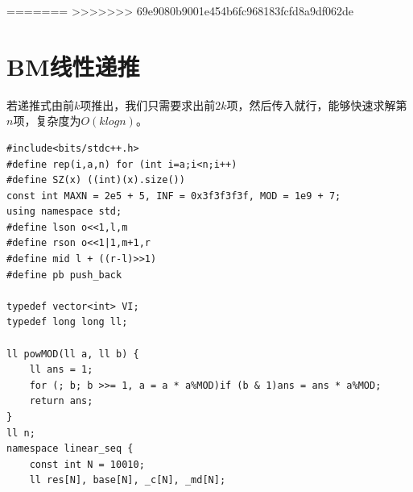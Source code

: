 \documentclass[a4paper,11pt,twoside,fontset = fandol,UTF8]{ctexbook} %
\begin{document}
=======
>>>>>>> 69e9080b9001e454b6fc968183fcfd8a9df062de
	\section{BM线性递推}
	若递推式由前$k$项推出，我们只需要求出前$2k$项，然后传入就行，能够快速求解第$n$项，复杂度为$O(klogn)$。
	\begin{lstlisting}
#include<bits/stdc++.h>
#define rep(i,a,n) for (int i=a;i<n;i++)
#define SZ(x) ((int)(x).size())
const int MAXN = 2e5 + 5, INF = 0x3f3f3f3f, MOD = 1e9 + 7;
using namespace std;
#define lson o<<1,l,m
#define rson o<<1|1,m+1,r
#define mid l + ((r-l)>>1)
#define pb push_back
 
typedef vector<int> VI;
typedef long long ll;
 
ll powMOD(ll a, ll b) {
    ll ans = 1;
    for (; b; b >>= 1, a = a * a%MOD)if (b & 1)ans = ans * a%MOD;
    return ans;
}
ll n;
namespace linear_seq {
    const int N = 10010;
    ll res[N], base[N], _c[N], _md[N];
 

\end{lstlisting}
\end{document}
